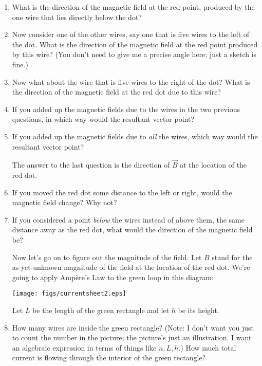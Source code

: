 \documentclass{article}
\begin{document}
\begin{enumerate}
\item What is the direction of the magnetic
field at the red point, produced by the one wire that lies directly below
the dot?

\item Now consider one of the other wires,
say one that is five wires to the left of the dot.
What is the direction of the magnetic field at the red point produced by this 
wire? (You don't need to give me a precise angle here; just a sketch is fine.)

\item Now what about the wire that is five wires to the right of the dot?
What is the direction of the magnetic field at the red dot due to this wire?

\item If you added up the magnetic fields due to the wires in the two
previous questions, in which way would the resultant vector point?

\item If you added up the magnetic fields due to \textit{all} the wires,
which way would the resultant vector point?

The answer to the last question is the direction of $\vec B$ at 
the location of the red dot.

\item If you moved the red dot some distance to the left or right,
would the magnetic field change? Why not?

\item If you considered a point \textit{below} the wires instead of
above them, the same distance away as the red dot, what would the
direction of the magnetic field be?

Now let's go on to figure out the magnitude of the field.
Let $B$ stand for the as-yet-unknown magnitude of the field at the location of
the red dot. We're going to apply Amp\`ere's Law to the green loop in this
diagram:

\centerline{\texttt{[image: figs/currentsheet2.eps]}}

Let $L$ be the length of the green rectangle
and let $h$ be its height. 

\item How many wires are inside
the green rectangle? (Note: I don't want you just to count the
number in the picture; the picture's just an illustration. I want
an algebraic expression in terms of things like $n,L,h$.) 
How much total current is flowing through the 
interior of the green rectangle?


\end{enumerate}
\end{document}
